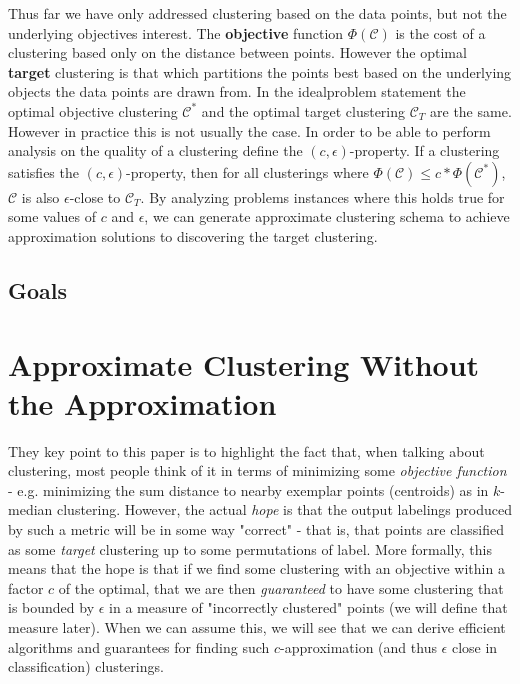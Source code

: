 \documentclass[paper=a4, fontsize=11pt]{scrartcl} %
\numberwithin{equation}{section} %
\numberwithin{figure}{section} %
\numberwithin{table}{section} %
\begin{document}
Thus far we have only addressed clustering based on the data points, but not the underlying objectives interest. The \textbf{objective} function $\Phi(\mathcal{C})$ is the cost of a clustering based only on the distance between points. However the optimal \textbf{target} clustering is that which partitions the points best based on the underlying objects the data points are drawn from. In the idealproblem statement the optimal objective clustering $\mathcal{C}^*$ and the optimal target clustering $\mathcal{C}_T$ are the same. However in practice this is not usually the case. In order to be able to perform analysis on the quality of a clustering \cite{firstpaper} define the $(c, \epsilon)$-property. If a clustering satisfies the $(c, \epsilon)$-property, then for all clusterings where $\Phi(\mathcal{C}) \leq c*\Phi(\mathcal{C}^*)$, $\mathcal{C}$ is also $\epsilon$-close to $\mathcal{C}_T$. By analyzing problems instances where this holds true for some values of $c$ and $\epsilon$, we can generate approximate clustering schema to achieve approximation solutions to discovering the target clustering.

\subsection{Goals}



\section{Approximate Clustering Without the Approximation}


They key point to this paper is to highlight the fact that, when talking about clustering, most people think of it in terms of minimizing some \emph{objective function} - e.g. minimizing the sum distance to nearby exemplar points (centroids) as in $k$-median clustering.  However, the actual \emph{hope} is that the output labelings produced by such a metric will be in some way "correct" - that is, that points are classified as some \emph{target} clustering up to some permutations of label.  More formally, this means that the hope is that if we find some clustering with an objective within a factor $c$ of the optimal, that we are then \emph{guaranteed} to have some clustering that is bounded by $\epsilon$ in a measure of "incorrectly clustered" points (we will define that measure later).  When we can assume this, we will see that we can derive efficient algorithms and guarantees for finding such $c$-approximation (and thus $\epsilon$ close in classification) clusterings.
\end{document}
